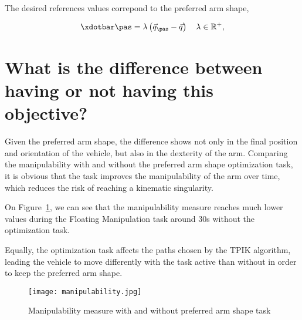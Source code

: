 \begin{parts}
\begin{solutionorbox}
			The desired references values correpond to the preferred
			arm shape, 

			\[
				 \xdotbar\pas = 
				\lambda\left(\vec{q}_{\pas} - \vec{q}\right)\quad
				\lambda\in\mathbb{R}^+
				\mathrm{,}
			\]	 			
		\end{solutionorbox}
		
		\part{What is the difference between having or not having this
		objective?}

		\begin{solutionorbox}
			Given the preferred arm shape, the difference shows not
			only in the final position and orientation of the
			vehicle, but also in the dexterity of the arm. Comparing
			the manipulability with and without the preferred arm
			shape optimization task, it is obvious that the task
			improves the manipulability of the arm over time, which
			reduces the risk of reaching a kinematic singularity.

			On Figure~\ref{fig:ex5_mu}, we can see that the
			manipulability measure reaches much lower values during
			the Floating Manipulation task around 30s without the
			optimization task. 

			Equally, the optimization task affects the paths chosen
			by the TPIK algorithm, leading the vehicle to move
			differently with the task active than without in order
			to keep the preferred arm shape.
		\end{solutionorbox}

		\begin{figure}[ht]
			\centering
			\texttt{[image: manipulability.jpg]}
			\caption{Manipulability measure with and without
				preferred arm shape task}%
			\label{fig:ex5_mu}
		\end{figure}
	\end{parts}
